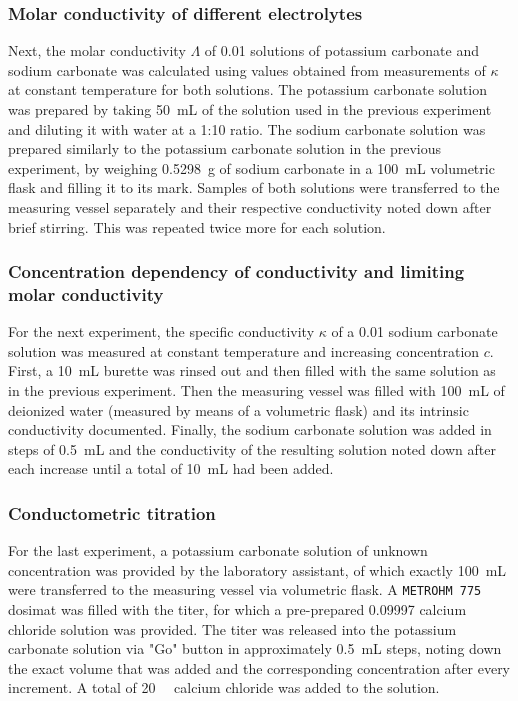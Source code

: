 \subsubsection{Molar conductivity of different electrolytes} 

Next, the molar conductivity $\Lambda$ of \qty{0.01}{\M} solutions of potassium carbonate and sodium carbonate was calculated using values obtained from measurements of $\kappa$ at constant temperature for both solutions. 
The potassium carbonate solution was prepared by taking \qty{50}{\milli\liter} of the solution used in the previous experiment and diluting it with water at a 1:10 ratio. 
The sodium carbonate solution was prepared similarly to the potassium carbonate solution in the previous experiment, by weighing \qty{0.5298}{\gram} of sodium carbonate in a \qty{100}{\milli\liter} volumetric flask and filling it to its mark.
Samples of both solutions were transferred to the measuring vessel separately and their respective conductivity noted down after brief stirring. This was repeated twice more for each solution.

\subsubsection{Concentration dependency of conductivity and limiting molar conductivity}

For the next experiment, the specific conductivity $\kappa$ of a \qty{0.01}{\M} sodium carbonate solution was measured at constant temperature and increasing concentration $c$. 
First, a \qty{10}{\milli\liter} burette was rinsed out and then filled with the same solution as in the previous experiment. Then the measuring vessel was filled with \qty{100}{\milli\liter} of deionized water (measured by means of a volumetric flask) and its intrinsic conductivity documented. Finally, the sodium carbonate solution was added in steps of \qty{0.5}{\milli\liter} and the conductivity of the resulting solution noted down after each increase until a total of \qty{10}{\milli\liter} had been added. 

\subsubsection{Conductometric titration}

For the last experiment, a potassium carbonate solution of unknown concentration was provided by the laboratory assistant, of which exactly \qty{100}{\milli\liter} were transferred to the measuring vessel via volumetric flask. A \texttt{METROHM 775} dosimat was filled with the titer, for which a pre-prepared \qty[round-precision=5]{0.09997}{\M} calcium chloride solution was provided. The titer was released into the potassium carbonate solution via "Go" button in approximately \qty{0.5}{\milli\liter} steps, noting down the exact volume that was added and the corresponding concentration after every increment. A total of \qty{20}{\milli\liters} calcium chloride was added to the solution. 





